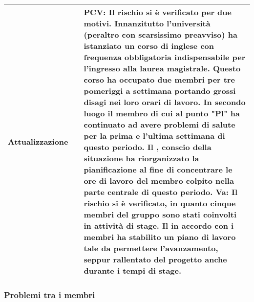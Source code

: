 	\newpage
	\small
	\begin{table}[H]
		\begin{center}			
			\begin{tabular}{p{2.5cm}p{0.5cm}p{11cm}}
				\arrayrulecolor{lightgray}
				\textbf{Attualizzazione}
				& &
				\textbf{PCV}: Il rischio si è verificato per due motivi. Innanzitutto l'università (peraltro con scarsissimo preavviso) ha istanziato un corso di inglese con frequenza obbligatoria indispensabile per l'ingresso alla laurea magistrale. Questo corso ha occupato due membri per tre pomeriggi a settimana portando grossi disagi nei loro orari di lavoro. In secondo luogo il membro di cui al punto "Pl" ha continuato ad avere problemi di salute per la prima e l'ultima settimana di questo periodo. Il \responsabile, conscio della situazione ha riorganizzato la pianificazione al fine di concentrare le ore di lavoro del membro colpito nella parte centrale di questo periodo.
				\newline
				\textbf{Va}: Il rischio si è verificato, in quanto cinque membri del gruppo sono stati coinvolti in attività di stage. Il \responsabilediprogetto{} in accordo con i membri ha stabilito un piano di lavoro tale da permettere l'avanzamento, seppur rallentato del progetto anche durante i tempi di stage.
				\\
				\bottomrule
			\end{tabular}
		\end{center}
	\end{table}
	
	
	\newpage
	\subsubsection {Problemi tra i membri}
	\label{subsec:pbmTraMembri}
	
